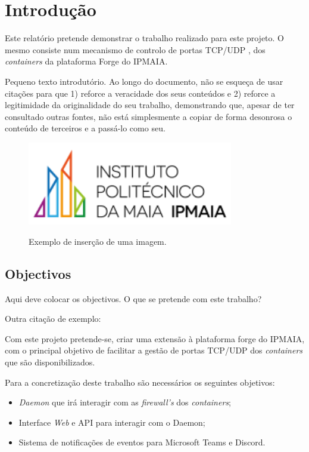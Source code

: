 \chapter{Introdução}
\label{chap:introduction}

Este relatório pretende demonstrar o trabalho realizado para este projeto. O mesmo consiste num mecanismo de controlo de portas TCP/UDP \cite{rfc9293}, \cite{rfc768} dos \textit{containers} da plataforma Forge do IPMAIA.

Pequeno texto introdutório. Ao longo do documento, não se esqueça de usar citações \cite{ismai_ead} para que 1) reforce a veracidade dos seus conteúdos e 2) reforce a legitimidade da originalidade do seu trabalho, demonstrando que, apesar de ter consultado outras fontes, não está simplesmente a copiar de forma desonrosa o conteúdo de terceiros e a passá-lo como seu.

\begin{figure}[ht]
\begin{center}
\includegraphics[width=9cm]{figs/logo_ipmaia_small.png}
\caption{Exemplo de inserção de uma imagem.}
\label{fig:bookstack}
\end{center}
\end{figure}

\section{Objectivos}
\label{sec:object}

Aqui deve colocar os objectivos. O que se pretende com este trabalho?

Outra citação de exemplo: \cite{rfc4512}

Com este projeto pretende-se, criar uma extensão à plataforma forge do IPMAIA, com o principal objetivo de facilitar a gestão de portas TCP/UDP dos \textit{containers} que são disponibilizados.

Para a concretização deste trabalho são necessários os seguintes objetivos:\\

\begin{itemize}
\item \textit{Daemon} que irá interagir com as \textit{firewall's} dos \textit{containers};
\item Interface \textit{Web} e API para interagir com o Daemon;
\item Sistema de notificações de eventos para Microsoft Teams e Discord.
\end{itemize}

